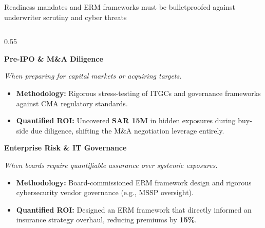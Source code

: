\documentclass[aspectratio=169, 9pt]{beamer}
\begin{document}
\begin{frame}{Readiness mandates and ERM frameworks must be bulletproofed against underwriter scrutiny and cyber threats}
    \vspace{-0.2cm}
    \begin{columns}[T]
        \begin{column}{0.55\textwidth}
            \begin{tcolorbox}[colback=bcgLightGray, colframe=bcgLightGray, arc=0pt, left=3pt, top=1pt, bottom=1pt]
                \textbf{\normalsize \color{bcgGreen} Pre-IPO \& M\&A Diligence}
            \end{tcolorbox}
            \textit{\small \color{gray} When preparing for capital markets or acquiring targets.}
            \begin{itemize}
                \item \textbf{Methodology:} Rigorous stress-testing of ITGCs and governance frameworks against CMA regulatory standards.
                \item \textbf{\color{bcgGreen} Quantified ROI:} Uncovered \textbf{SAR 15M} in hidden exposures during buy-side due diligence, shifting the M\&A negotiation leverage entirely.
            \end{itemize}
            
            \vspace{0.1cm}
            \begin{tcolorbox}[colback=bcgLightGray, colframe=bcgLightGray, arc=0pt, left=3pt, top=1pt, bottom=1pt]
                \textbf{\normalsize \color{bcgGreen} Enterprise Risk \& IT Governance}
            \end{tcolorbox}
            \textit{\small \color{gray} When boards require quantifiable assurance over systemic exposures.}
            \begin{itemize}
                \item \textbf{Methodology:} Board-commissioned ERM framework design and rigorous cybersecurity vendor governance (e.g., MSSP oversight).
                \item \textbf{\color{bcgGreen} Quantified ROI:} Designed an ERM framework that directly informed an insurance strategy overhaul, reducing premiums by \textbf{15\%}.
            \end{itemize}
        \end{column}
        

\end{columns}
\end{frame}
\end{document}
